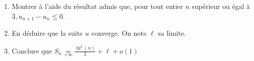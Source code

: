 \documentclass[a4paper, 11pt,reqno]{article}
\begin{document}
\begin{exercice}[Agro 2016]
\begin{enumerate}
\begin{enumerate}
\item Montrer à l'aide du résultat admis que, pour tout entier $n$ supérieur ou égal à $3, u_{n+1}-u_n \leq 0$.
\item En déduire que la suite $u$ converge. On note $\ell$ sa limite.
\item Conclure que $S_n \underset{+\infty}{=}  \frac{\ln^2(n)}{2} +\ell +o(1)$
\end{enumerate}
%
%
\end{enumerate}

\end{exercice}
\end{document}
